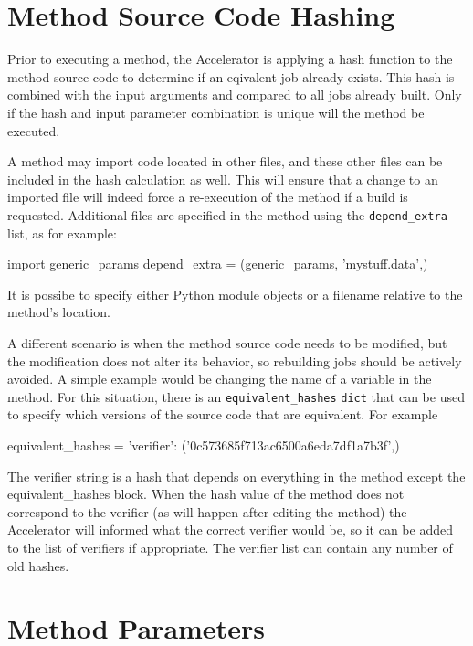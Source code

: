 \section{Method Source Code Hashing}

Prior to executing a method, the Accelerator is applying a hash
function to the method source code to determine if an eqivalent job
already exists.  This hash is combined with the input arguments and
compared to all jobs already built.  Only if the hash and input
parameter combination is unique will the method be executed.

A method may import code located in other files, and these other files
can be included in the hash calculation as well.  This will ensure
that a change to an imported file will indeed force a re-execution of
the method if a build is requested.  Additional files are specified in
the method using the \texttt{depend\_extra} list, as for example:
\begin{python}
import generic_params
depend_extra = (generic_params, 'mystuff.data',)
\end{python}
It is possibe to specify either Python module objects or a filename
relative to the method's location.

A different scenario is when the method source code needs to be
modified, but the modification does not alter its behavior, so
rebuilding jobs should be actively avoided.  A simple example would be
changing the name of a variable in the method.  For this situation,
there is an \texttt{equivalent\_hashes} \texttt{dict} that can be used
to specify which versions of the source code that are equivalent.  For
example
\begin{python}
  equivalent_hashes = {'verifier': ('0c573685f713ac6500a6eda7df1a7b3f',)}
\end{python}
The verifier string is a hash that depends on everything in the method
except the equivalent\_hashes block.  When the hash value of the
method does not correspond to the verifier (as will happen after
editing the method) the Accelerator will informed what the correct
verifier would be, so it can be added to the list of verifiers if
appropriate.  The verifier list can contain any number of old hashes.




\clearpage
\section{Method Parameters}

